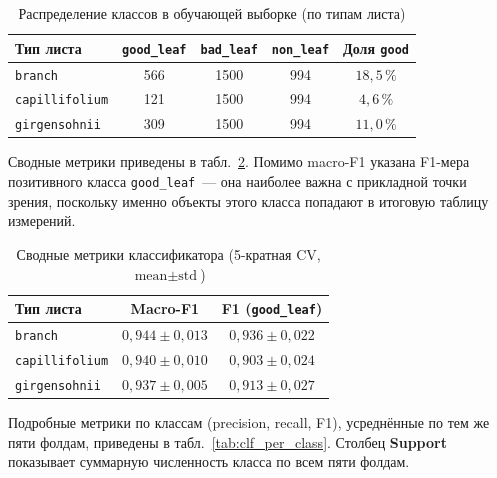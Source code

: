 \begin{table}[H]
\centering
\caption{Распределение классов в обучающей выборке (по типам листа)}
\label{tab:clf_balance}
\small
\begin{tabular}{lcccc}
\hline
\textbf{Тип листа} & \texttt{good\_leaf} & \texttt{bad\_leaf} & \texttt{non\_leaf} & \textbf{Доля \texttt{good}} \\
\hline
\texttt{branch}        & 566  & 1500 & 994  & $18{,}5\,\%$ \\
\texttt{capillifolium} & 121  & 1500 & 994  & $4{,}6\,\%$  \\
\texttt{girgensohnii}  & 309  & 1500 & 994  & $11{,}0\,\%$ \\
\hline
\end{tabular}
\end{table}

Сводные метрики приведены в табл.~\ref{tab:clf_overall}. Помимо macro-F1
указана F1-мера позитивного класса \texttt{good\_leaf}~--- она наиболее важна
с прикладной точки зрения, поскольку именно объекты этого класса попадают
в итоговую таблицу измерений.

\begin{table}[H]
\centering
\caption{Сводные метрики классификатора (5-кратная CV, $\text{mean} \pm \text{std}$)}
\label{tab:clf_overall}
\small
\begin{tabular}{lcc}
\hline
\textbf{Тип листа} & \textbf{Macro-F1} & \textbf{F1 (\texttt{good\_leaf})} \\
\hline
\texttt{branch}        & $0{,}944 \pm 0{,}013$ & $0{,}936 \pm 0{,}022$ \\
\texttt{capillifolium} & $0{,}940 \pm 0{,}010$ & $0{,}903 \pm 0{,}024$ \\
\texttt{girgensohnii}  & $0{,}937 \pm 0{,}005$ & $0{,}913 \pm 0{,}027$ \\
\hline
\end{tabular}
\end{table}

Подробные метрики по классам (precision, recall, F1), усреднённые по тем же
пяти фолдам, приведены в табл.~\ref{tab:clf_per_class}. Столбец \textbf{Support}
показывает суммарную численность класса по всем пяти фолдам.

